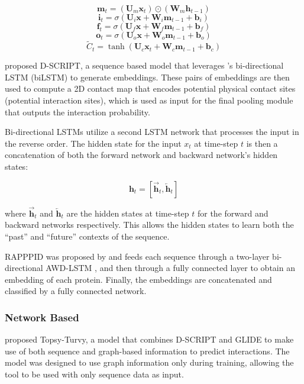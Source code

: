 \documentclass{article}
\begin{document}
\[\mathbf{m}_t = (\mathbf{U}_m\mathbf{x}_t) \odot (\mathbf{W}_m\mathbf{h}_{t-1})\]
\[\mathbf{i}_t = \sigma(\mathbf{U}_i\mathbf{x} + \mathbf{W}_i\mathbf{m}_{t-1} + \mathbf{b}_i)\]
\[\mathbf{f}_t = \sigma(\mathbf{U}_f\mathbf{x} + \mathbf{W}_f\mathbf{m}_{t-1} + \mathbf{b}_f)\]
\[\mathbf{o}_t = \sigma(\mathbf{U}_o\mathbf{x} + \mathbf{W}_o\mathbf{m}_{t-1} + \mathbf{b}_o)\]
\[\tilde C_t = \tanh(\mathbf{U}_c\mathbf{x}_t + \mathbf{W}_c\mathbf{m}_{t-1}+\mathbf{b}_c)\]

\citet{sledzieski_d-script_2021} proposed D-SCRIPT, a sequence based model that leverages \citet{bepler_learning_2021}'s bi-directional LSTM (biLSTM) to generate embeddings. These pairs of embeddings are then used to compute a 2D contact map that encodes potential physical contact sites (potential interaction sites), which is used as input for the final pooling module that outputs the interaction probability. 

Bi-directional LSTMs utilize a second LSTM network that processes the input in the reverse order. The hidden state for the input \(x_t\) at time-step \(t\) is then a concatenation of both the forward network and backward network's hidden states:

\[\mathbf{h}_t = [\overrightarrow{\mathbf{h}}_t, \overleftarrow{\mathbf{h}}_t]\]

where \(\overrightarrow{\mathbf{h}}_t\) and \(\overleftarrow{\mathbf{h}}_t\) are the hidden states at time-step \(t\) for the forward and backward networks respectively. This allows the hidden states to learn both the ``past'' and ``future'' contexts of the sequence. 

RAPPPID was proposed by \citet{szymborski_rapppid_2022} and feeds each sequence through a two-layer bi-directional AWD-LSTM \citep{merity2017regularizingoptimizinglstmlanguage}, and then through a fully connected layer to obtain an embedding of each protein. Finally, the embeddings are concatenated and classified by a fully connected network.

\subsubsection{Network Based}
\citet{singh_topsy-turvy_2022} proposed Topsy-Turvy, a model that combines D-SCRIPT \citep{sledzieski_d-script_2021} and GLIDE \citep{devkota_glide_2020} to make use of both sequence and graph-based information to predict interactions. The model was designed to use graph information only during training, allowing the tool to be used with only sequence data as input.
\end{document}
